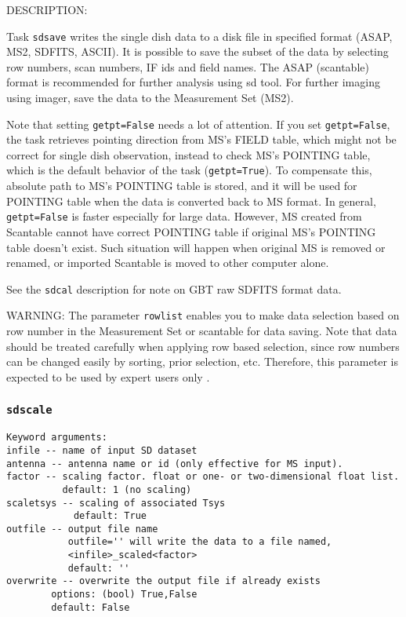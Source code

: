 DESCRIPTION:

Task {\tt sdsave} writes the single dish data to a disk file in 
specified format (ASAP, MS2, SDFITS, ASCII). It is possible to
save the subset of the data by selecting row numbers, scan numbers, IF ids
and field names. The ASAP (scantable) format is recommended for
further analysis using sd tool. For further imaging using imager,
save the data to the Measurement Set (MS2).
          
Note that setting {\tt getpt=False} needs a lot of attention.
If you set {\tt getpt=False}, the task retrieves pointing direction from 
MS's FIELD table, which might not be correct for single dish 
observation, instead to check MS's POINTING table, which is the 
default behavior of the task ({\tt getpt=True}). To compensate this, 
absolute path to MS's POINTING table is stored, and it will be used 
for POINTING table when the data is converted back to MS format. 
In general, {\tt getpt=False} is faster especially for large data. However, 
MS created from Scantable cannot have correct POINTING table if 
original MS's POINTING table doesn't exist. Such situation will 
happen when original MS is removed or renamed, or imported Scantable 
is moved to other computer alone.

See the {\tt sdcal} description for note on GBT raw SDFITS format data.

WARNING:  The parameter {\tt rowlist} enables you to make data selection based
on row number in the Measurement Set or scantable for data saving. 
Note that data should be treated carefully when applying row
based selection, since row numbers can be changed easily by
sorting, prior selection, etc. Therefore, this parameter is expected
to be used by expert users only . 





\subsubsection{{\tt sdscale}}
\label{section:sd.sdtasks.tasks.sdscale}

\begin{verbatim}
Keyword arguments:
infile -- name of input SD dataset
antenna -- antenna name or id (only effective for MS input). 
factor -- scaling factor. float or one- or two-dimensional float list.
          default: 1 (no scaling)
scaletsys -- scaling of associated Tsys
            default: True
outfile -- output file name 
           outfile='' will write the data to a file named,
           <infile>_scaled<factor>
           default: ''
overwrite -- overwrite the output file if already exists
        options: (bool) True,False
        default: False
\end{verbatim}

